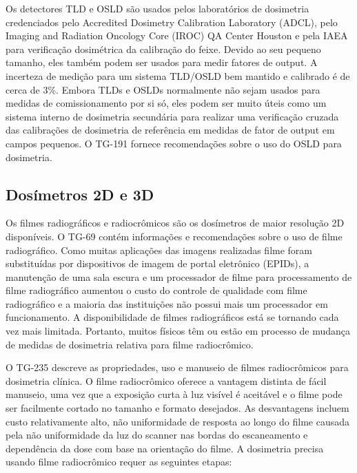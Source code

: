 \documentclass[11pt,a4paper]{article}
\begin{document}
	Os detectores TLD e OSLD são usados pelos laboratórios de dosimetria credenciados pelo Accredited Dosimetry Calibration Laboratory (ADCL), pelo Imaging and Radiation Oncology Core (IROC) QA Center Houston e pela IAEA para verificação dosimétrica da calibração do feixe. Devido ao seu pequeno tamanho, eles também podem ser usados para medir fatores de output. A incerteza de medição para um sistema TLD/OSLD bem mantido e calibrado é de cerca de 3\%. Embora TLDs e OSLDs normalmente não sejam usados para medidas de comissionamento por si só, eles podem ser muito úteis como um sistema interno de dosimetria secundária para realizar uma verificação cruzada das calibrações de dosimetria de referência em medidas de fator de output em campos pequenos. O TG-191 fornece recomendações sobre o uso do OSLD para dosimetria. 

\subsection{Dosímetros 2D e 3D}

	Os filmes radiográficos e radiocrômicos são os dosímetros de maior resolução 2D disponíveis. O TG-69 contém informações e recomendações sobre o uso de filme radiográfico. Como muitas aplicações das imagens realizadas filme foram substituídas por dispositivos de imagem de portal eletrônico (EPIDs), a manutenção de uma sala escura e um processador de filme para processamento de filme radiográfico aumentou o custo do controle de qualidade com filme radiográfico e a maioria das instituições não possui mais um processador em funcionamento. A disponibilidade de filmes radiográficos está se tornando cada vez mais limitada. Portanto, muitos físicos têm ou estão em processo de mudança de medidas de dosimetria relativa para filme radiocrômico.

	O TG-235 descreve as propriedades, uso e manuseio de filmes radiocrômicos para dosimetria clínica. O filme radiocrômico oferece a vantagem distinta de fácil manuseio, uma vez que a exposição curta à luz visível é aceitável e o filme pode ser facilmente cortado no tamanho e formato desejados. As desvantagens incluem custo relativamente alto, não uniformidade de resposta ao longo do filme causada pela não uniformidade da luz do scanner nas bordas do escaneamento e dependência da dose com base na orientação do filme. A dosimetria precisa usando filme radiocrômico requer as seguintes etapas:
\end{document}
